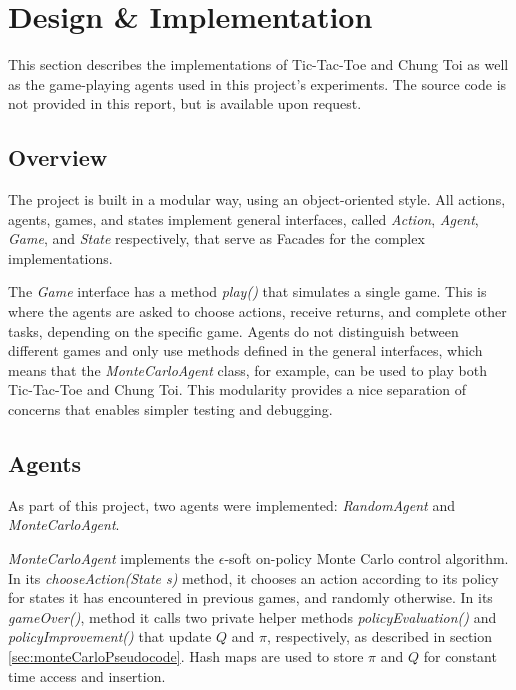 \documentclass[11pt,a4paper]{report}
\begin{document}
\chapter{Design \& Implementation}

This section describes the implementations of Tic-Tac-Toe and Chung Toi as well as the game-playing agents used in this project's experiments. The source code is not provided in this report, but is available upon request.


\section{Overview} %

The project is built in a modular way, using an object-oriented style. All actions, agents, games, and states implement general interfaces, called \emph{Action}, \emph{Agent}, \emph{Game}, and \emph{State} respectively, that serve as Facades for the complex implementations.

The \emph{Game} interface has a method \emph{play()} that simulates a single game. This is where the agents are asked to choose actions, receive returns, and complete other tasks, depending on the specific game. Agents do not distinguish between different games and only use methods defined in the general interfaces, which means that the \emph{MonteCarloAgent} class, for example, can be used to play both Tic-Tac-Toe and Chung Toi. This modularity provides a nice separation of concerns that enables simpler testing and debugging.


\section{Agents}

As part of this project, two agents were implemented: \emph{RandomAgent} and \emph{MonteCarloAgent}. 

\emph{MonteCarloAgent} implements the $\epsilon$-soft on-policy Monte Carlo control algorithm. In its \emph{chooseAction(State s)} method, it chooses an action according to its policy for states it has encountered in previous games, and randomly otherwise. In its \emph{gameOver()}, method it calls two private helper methods \emph{policyEvaluation()} and \emph{policyImprovement()} that update $Q$ and $\pi$, respectively, as described in section \ref{sec:monteCarloPseudocode}. Hash maps are used to store $\pi$ and $Q$ for constant time access and insertion.
\end{document}
